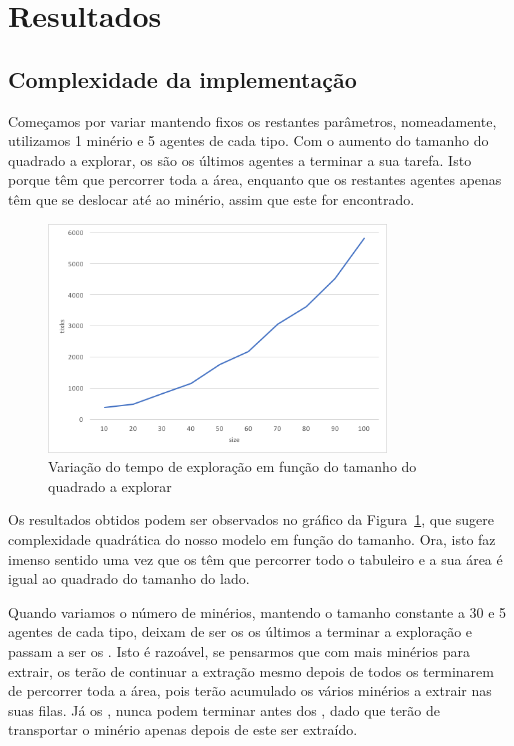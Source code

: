 \documentclass[12pt]{report}
\begin{document}
\section{Resultados}

\subsection{Complexidade da implementação}

Começamos por variar \size mantendo fixos os restantes parâmetros, nomeadamente, utilizamos 1 minério e 5 agentes de cada tipo. Com o aumento do tamanho do quadrado a explorar, os \spotters são os últimos agentes a terminar a sua tarefa. Isto porque têm que percorrer toda a área, enquanto que os restantes agentes apenas têm que se deslocar até ao minério, assim que este for encontrado. 

\begin{figure}[h]
	\centering
    \includegraphics[width=0.8\textwidth]{ticks-size}
	\caption{Variação do tempo de exploração em função do tamanho do quadrado a explorar}
	\label{ticks-size}
\end{figure}

Os resultados obtidos podem ser observados no gráfico da Figura~\ref{ticks-size}, que sugere complexidade quadrática do nosso modelo em função do tamanho. Ora, isto faz imenso sentido uma vez que os \spotters têm que percorrer todo o tabuleiro e a sua área é igual ao quadrado do tamanho do lado.

Quando variamos o número de minérios, mantendo o tamanho constante a 30 e 5 agentes de cada tipo, deixam de ser os \spotters os últimos a terminar a exploração e passam a ser os \transporters. Isto é razoável, se pensarmos que com mais minérios para extrair, os \producers terão de continuar a extração mesmo depois de todos os \spotters terminarem de percorrer toda a área, pois terão acumulado os vários minérios a extrair nas suas filas. Já os \transporters, nunca podem terminar antes dos \producers, dado que terão de transportar o minério apenas depois de este ser extraído.
\end{document}
